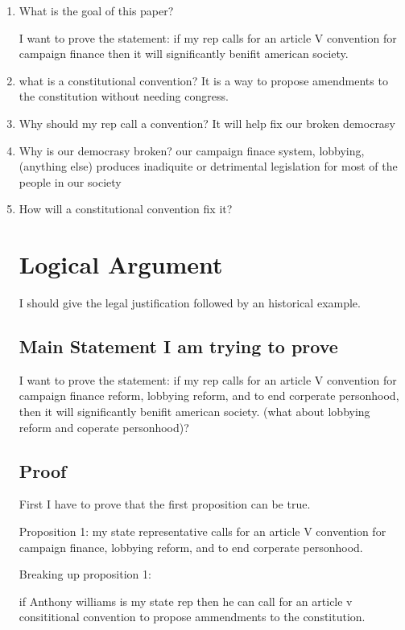 \documentclass[11pt]{article} %
\begin{document}
\begin{enumerate}

\item  What is the goal of this paper?

I want to prove the statement: if my rep calls for an article V convention for campaign finance then it will significantly benifit american society.

\item what is a constitutional convention? It is a way to propose amendments to the constitution without needing congress. 

\item  Why should my rep call a convention?
 It will help fix our broken democrasy

\item Why is our democrasy broken?
our campaign finace system, lobbying, (anything else) produces inadiquite or detrimental legislation for most of the people in our society 

\item How will a constitutional convention fix it?

\section{Logical Argument}
  I should give the legal justification followed by an historical example. 
\subsection{Main Statement I am trying to prove}

I want to prove the statement: if my rep calls for an article V convention for campaign finance reform, lobbying reform, and to end corperate personhood,  then it will significantly benifit american society. (what about lobbying reform and coperate personhood)? 

\subsection{Proof}

First I have to prove that the first proposition can be true.

Proposition 1: my state representative calls for an article V convention for campaign finance, lobbying reform, and to end corperate personhood.

Breaking up proposition 1:

if Anthony williams is my state rep then he can call for an article v consititional convention to propose ammendments to the constitution.


\end{enumerate}
\end{document}
